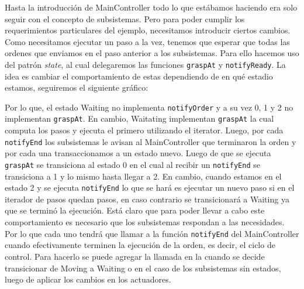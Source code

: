 Hasta la introducción de MainController todo lo que estábamos haciendo era solo seguir con el concepto de subsistemas. Pero para poder cumplir los requerimientos particulares del ejemplo, necesitamos introducir ciertos cambios. Como necesitamos ejecutar un paso a la vez, tenemos que esperar que todas las ordenes que enviamos en el paso anterior a los subsistemas. Para ello hacemos uso del patrón \textit{state}, al cual delegaremos las funciones \verb|graspAt| y \verb|notifyReady|. La idea es cambiar el comportamiento de estas dependiendo de en qué estadio estamos, seguiremos el siguiente gráfico:

\begin{figure}[h]
\begin{center}
\end{center}
\end{figure}

Por lo que, el estado Waiting no implementa \verb|notifyOrder| y a su vez 0, 1 y 2 no implementan \verb|graspAt|. En cambio, Waitating implementan \verb|graspAt| la cual computa los pasos y ejecuta el primero utilizando el iterator. Luego, por cada \verb|notifyEnd| los subsistemas le avisan al MainController que terminaron la orden y por cada una transaccionamos a un estado nuevo. Luego de que se ejecuta \verb|graspAt| se transiciona al estado 0 en el cual al recibir un \verb|notifyEnd| se transiciona a 1 y lo mismo hasta llegar a 2. En cambio, cuando estamos en el estado 2 y se ejecuta \verb|notifyEnd| lo que se hará es ejecutar un nuevo paso si en el iterador de pasos quedan pasos, en caso contrario se transicionará a Waiting ya que se terminó la ejecución. Está claro que para poder llevar a cabo este comportamiento es necesario que los subsistemas respondan a las necesidades. Por lo que cada uno tendrá que llamar a la función \verb|notifyEnd| del MainController cuando efectivamente terminen la ejecución de la orden, es decir, el ciclo de control. Para hacerlo se puede agregar la llamada en la cuando se decide transicionar de Moving a Waiting o en el caso de los subsistemas sin estados, luego de aplicar los cambios en los actuadores.

